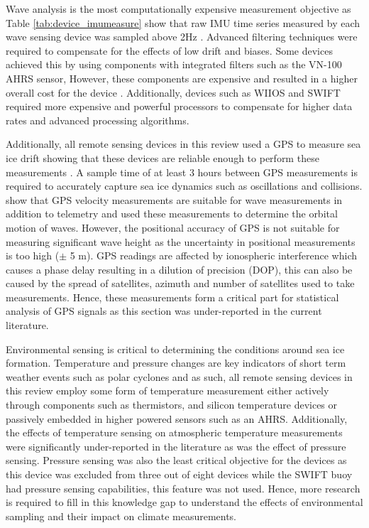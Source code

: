Wave analysis is the most computationally expensive measurement objective as 
Table \ref{tab:device_imumeasure} show that raw IMU time series measured by each wave sensing device was sampled above 2Hz \cite{kohout2015device}. Advanced filtering techniques were required to compensate for the effects of low drift and biases. Some devices achieved this by using components with integrated filters such as the VN-100 AHRS sensor, However, these components  are expensive and resulted in a higher overall cost for the device \cite{guimaraes2018surface}. Additionally, devices such as WIIOS and SWIFT required more expensive and powerful processors to compensate for higher data rates and advanced processing algorithms. \par 

Additionally, all remote sensing devices in this review used a GPS to measure sea ice drift showing that these devices are reliable enough to perform these measurements \cite{doble2017robust}. A sample time of at least 3 hours between GPS measurements is required to accurately capture sea ice dynamics such as oscillations and collisions. \textcite{thomson2012wave} show that GPS velocity measurements are suitable for wave measurements in addition to telemetry and used these measurements to determine the orbital motion of waves. However, the positional accuracy of GPS is not suitable for measuring significant wave height as the uncertainty in positional measurements is too high ($\pm$ 5 m). GPS readings are affected by ionospheric interference which causes a phase delay resulting in a dilution of precision (DOP), this can also be caused by the spread of satellites, azimuth and number of satellites used to take measurements. Hence, these measurements form a critical part for statistical analysis of GPS signals as this section was under-reported in the current literature. \par 

Environmental sensing is critical to determining the conditions around sea ice formation. Temperature and pressure changes are key indicators of short term weather events such as polar cyclones and as such, all remote sensing devices in this review employ some form of temperature measurement either actively through components such as thermistors, and silicon temperature devices or passively embedded in higher powered sensors such as an AHRS. Additionally, the effects of temperature sensing on atmospheric temperature measurements were significantly under-reported in the literature as was the effect of pressure sensing.  Pressure sensing was also the least critical objective for the devices as this device was excluded from three out of eight devices while the SWIFT buoy had pressure sensing capabilities, this feature was not used. Hence, more research is required to fill in this knowledge gap to understand the effects of environmental sampling and their impact on climate measurements. \par

